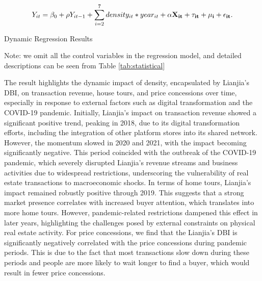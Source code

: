 \documentclass[12pt]{article}
\begin{document}
\begin{equation}
    Y_{it} = \beta_0 + \rho Y_{it-1} + \sum_{i=2}^7 density_{it} * year_{it} + \bf{\alpha} \bf{X}_{it} + \tau_{it} + \mu_i + \epsilon_{it}. \label{eq:dynamic}
\end{equation}

\begin{table}[H]
  \begin{center}
    \begin{scriptsize}
    \caption{Dynamic Regression Results}
    \label{tab:Dynamic}
    

    Note: we omit all the control variables in the regression model, and detailed descriptions can be seen from Table \ref{tab:statistical}
    \end{scriptsize}
  \end{center}
\end{table}

The result highlights the dynamic impact of density, encapsulated by Lianjia's DBI, on transaction revenue, house tours, and price concessions over time, especially in response to external factors such as digital transformation and the COVID-19 pandemic. Initially, Lianjia's impact on transaction revenue showed a significant positive trend, peaking in 2018, due to its digital transformation efforts, including the integration of other platform stores into its shared network.  However, the momentum slowed in 2020 and 2021, with the impact becoming significantly negative. This period coincided with the outbreak of the COVID-19 pandemic, which severely disrupted Lianjia's revenue streams and business activities due to widespread restrictions, underscoring the vulnerability of real estate transactions to macroeconomic shocks. In terms of home tours, Lianjia's impact remained robustly positive through 2019. This suggests that a strong market presence correlates with increased buyer attention, which translates into more home tours. However, pandemic-related restrictions dampened this effect in later years, highlighting the challenges posed by external constraints on physical real estate activity. For price concessions, we find that the Lianjia's DBI is significantly negatively correlated with the price concessions during pandemic periods. This is due to the fact that most transactions slow down during these periods and people are more likely to wait longer to find a buyer, which would result in fewer price concessions.

\end{document}
